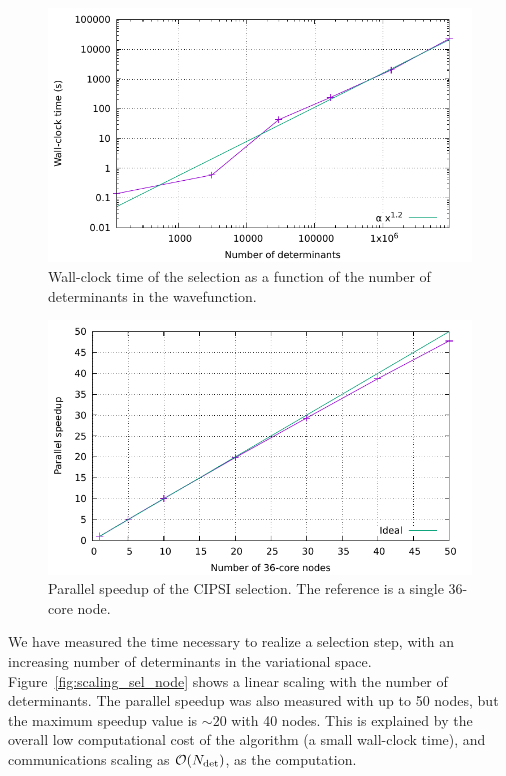 \documentclass[./thesis.tex]{subfiles}
\begin{document}
\begin{figure}[hbt]
    \begin{center}
      \includegraphics[width=0.8\columnwidth]{figures/perf/scaling_sel_det}
      \caption{Wall-clock time of the selection as a function of the number of
determinants in the wavefunction.}
      \label{fig:scaling_sel_ndet}
    \end{center}
\end{figure}

\begin{figure}[h]
    \begin{center}
      \includegraphics[width=0.8\columnwidth]{figures/perf/scaling_sel_node}
      \caption{Parallel speedup of the CIPSI selection. The reference is a single 36-core node.}
      \label{fig:speedup_sel_node}
    \end{center}
\end{figure}

We have measured the time necessary to realize a selection step, with an
increasing number of determinants in the variational space.
Figure~\ref{fig:scaling_sel_node} shows a linear scaling with the number of
determinants. The parallel speedup was also measured with up to 50 nodes, but
the maximum speedup value is $\sim 20$ with 40 nodes. This is explained by
the overall low computational cost of the algorithm (a small wall-clock time), 
and communications scaling as $\order{\Ndet}$, as the computation.
\end{document}
